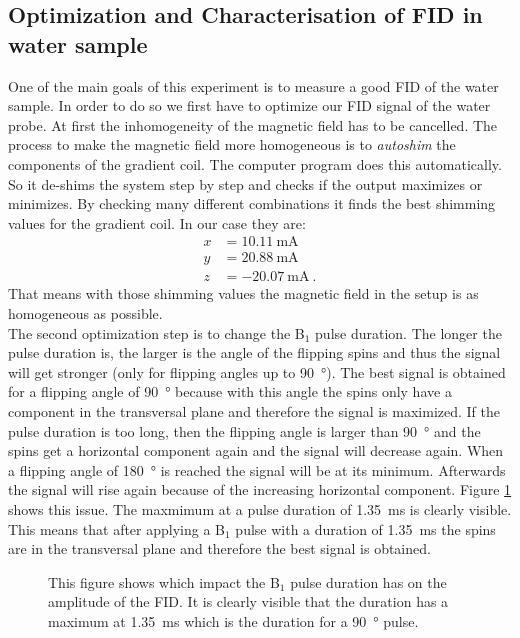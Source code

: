 \subsection{Optimization and Characterisation of FID in water sample}
\label{sec:OptimizationandCharacterisationofFIDinwatersample}

One of the main goals of this experiment is to measure a good FID of the water sample.
In order to do so we first have to optimize our FID signal of the water probe.\newline
At first the inhomogeneity of the magnetic field has to be cancelled.
The process to make the magnetic field more homogeneous is to \textit{autoshim} the components of the gradient coil.
The computer program does this automatically. So it de-shims the system step by step and checks if the output maximizes or minimizes.
By checking many different combinations it finds the best shimming values for the gradient coil.
In our case they are:
\begin{align*}
    x &= \SI{10.11}{\milli \ampere}\\
    y &= \SI{20.88}{\milli \ampere}\\
    z &= \SI{-20.07}{\milli \ampere} \ .
    \label{eq: shimmingvalues}
\end{align*}
That means with those shimming values the magnetic field in the setup is as homogeneous as possible.
\\
The second optimization step is to change the B$_1$ pulse duration.
The longer the pulse duration is, the larger is the angle of the flipping spins and thus the signal will get stronger (only for flipping angles up to \SI{90}{\degree}).
The best signal is obtained for a flipping angle of \SI{90}{\degree} because with this angle the spins only have a component in the transversal plane and therefore the signal is maximized.
If the pulse duration is too long, then the flipping angle is larger than \SI{90}{\degree} and the spins get a horizontal component again and the signal will decrease again.
When a flipping angle of \SI{180}{\degree} is reached the signal will be at its minimum.
Afterwards the signal will rise again because of the increasing horizontal component.
Figure \ref{fig:B1dauer} shows this issue.
The maxmimum at a pulse duration of \SI{1.35}{\milli \second} is clearly visible.
This means that after applying a B$_1$ pulse with a duration of \SI{1.35}{\milli \second} the spins are in the transversal plane and therefore the best signal is obtained.
\begin{figure}[H]
    \centering
    
    \caption[This figure shows which impact the B$_1$ pulse duration has on the amplitude of the FID.]{This figure shows which impact the B$_1$ pulse duration has on the amplitude of the FID.
    It is clearly visible that the duration has a maximum at \SI{1.35}{\milli \second} which is the duration for a \SI{90}{\degree} pulse.}
    \label{fig:B1dauer}
\end{figure}
